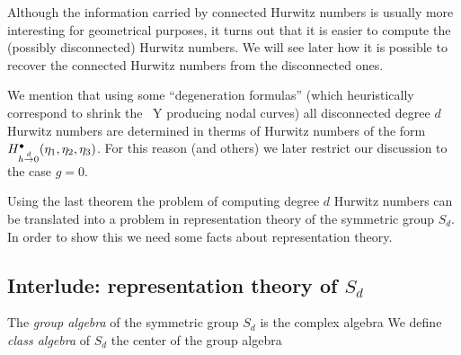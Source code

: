 \documentclass[10pt]{beamer}
\begin{document}
\begin{frame}

Although the information carried by connected Hurwitz numbers is usually more interesting for geometrical purposes, it turns out that it is easier to compute the (possibly disconnected) Hurwitz numbers. We will see later how it is possible to recover the connected Hurwitz numbers from the disconnected ones. 

We mention that using some ``degeneration formulas'' (which heuristically correspond to shrink the \rs\ Y producing nodal curves) all disconnected degree $d$ Hurwitz numbers are determined in therms of Hurwitz numbers of the form $H^\bullet_{h\overset d\to0}(\eta_1,\eta_2,\eta_3)$. For this reason (and others) we later restrict our discussion to the case $g=0$. 



Using the last theorem the problem of computing degree $d$ Hurwitz numbers can be translated into a problem in representation theory of the symmetric group $S_d$. In order to show this we need some facts about representation theory. 

\end{frame}

\subsection{Interlude: representation theory of $S_d$}

\begin{frame}

\begin{definition}
	The \emph{group algebra} of the symmetric group $S_d$ is the complex algebra
	We define \emph{class algebra} of $S_d$ the center of the group algebra
\end{definition}


\end{frame}
\end{document}
